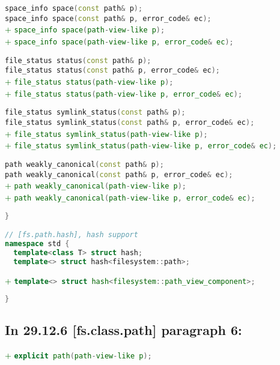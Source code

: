 \documentclass[11pt]{article}
\newcommand{\code}[2][cpp]{\lstinline[language=#1,basicstyle=\small\ttfamily]{#2}}
\newcommand{\tsrefp}[3]{\subsection*{In #2 \textbf{[#1]} paragraph #3:}}
\newcommand{\tsreplace}[3]{\textcolor{red}{\sout{#1}}#2\textcolor{darkgreen}{#3}}
\begin{document}
\tsreplace{}{  \code{space_info space(const path& p);}}{}\\
\tsreplace{}{  \code{space_info space(const path& p, error_code& ec);}}{}\\
\tsreplace{}{}{+ \code{space_info space(path-view-like p);}}\\
\tsreplace{}{}{+ \code{space_info space(path-view-like p, error_code& ec);}}

\tsreplace{}{  \code{file_status status(const path& p);}}{}\\
\tsreplace{}{  \code{file_status status(const path& p, error_code& ec);}}{}\\
\tsreplace{}{}{+ \code{file_status status(path-view-like p);}}\\
\tsreplace{}{}{+ \code{file_status status(path-view-like p, error_code& ec);}}

\tsreplace{}{  \code{file_status symlink_status(const path& p);}}{}\\
\tsreplace{}{  \code{file_status symlink_status(const path& p, error_code& ec);}}{}\\
\tsreplace{}{}{+ \code{file_status symlink_status(path-view-like p);}}\\
\tsreplace{}{}{+ \code{file_status symlink_status(path-view-like p, error_code& ec);}}

\tsreplace{}{  \code{path weakly_canonical(const path& p);}}{}\\
\tsreplace{}{  \code{path weakly_canonical(const path& p, error_code& ec);}}{}\\
\tsreplace{}{}{+ \code{path weakly_canonical(path-view-like p);}}\\
\tsreplace{}{}{+ \code{path weakly_canonical(path-view-like p, error_code& ec);}}

\begin{lstlisting}[language=cpp]
}

// [fs.path.hash], hash support
namespace std {
  template<class T> struct hash;
  template<> struct hash<filesystem::path>;
\end{lstlisting}

\tsreplace{}{}{+ \code{template<> struct hash<filesystem::path_view_component>;}}

\begin{lstlisting}[language=cpp]
}
\end{lstlisting}

\tsrefp{fs.class.path}{29.12.6}{6}

\tsreplace{}{}{+ \code{explicit path(path-view-like p);}}
\end{document}
